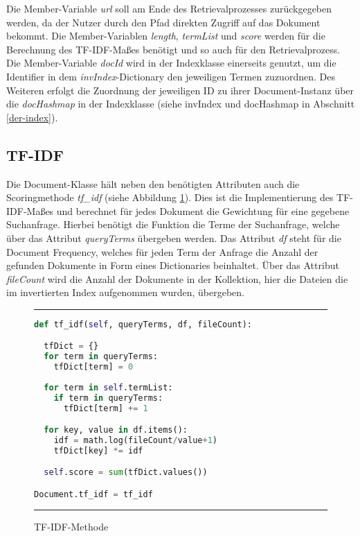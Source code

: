 Die Member-Variable \textit{url} soll am Ende des Retrievalprozesses zurückgegeben werden, da der Nutzer durch den Pfad direkten Zugriff auf das Dokument bekommt. Die Member-Variablen \textit{length}, \textit{termList} und \textit{score} werden für die Berechnung des TF-IDF-Maßes benötigt und so auch für den Retrievalprozess. Die Member-Variable \textit{docId} wird in der Indexklasse einerseits genutzt, um die Identifier in dem \textit{invIndex}-Dictionary den jeweiligen Termen zuzuordnen. Des Weiteren erfolgt die Zuordnung der jeweiligen ID zu ihrer Document-Instanz über die \textit{docHashmap} in der Indexklasse (siehe invIndex und docHashmap in Abschnitt \ref{der-index}).

\subsection{TF-IDF}\label{tf-idf}

Die Document-Klasse hält neben den benötigten Attributen auch die Scoringmethode \textit{tf\_idf} (siehe Abbildung \ref{fig:tfidf}). Dies ist die Implementierung des TF-IDF-Maßes und berechnet für jedes Dokument die Gewichtung für eine gegebene Suchanfrage. Hierbei benötigt die Funktion die Terme der Suchanfrage, welche über das Attribut \textit{queryTerms} übergeben werden. Das Attribut \textit{df} steht für die Document Frequency, welches für jeden Term der Anfrage die Anzahl der gefunden Dokumente in Form eines Dictionaries beinhaltet. Über das Attribut \textit{fileCount} wird die Anzahl der Dokumente in der Kollektion, hier die Dateien die im invertierten Index aufgenommen wurden, übergeben.

\begin{figure}
	\rule{\textwidth}{0.4pt}
		\begin{lstlisting}[language=Python]
def tf_idf(self, queryTerms, df, fileCount):

  tfDict = {}
  for term in queryTerms:
    tfDict[term] = 0  
  
  for term in self.termList:
    if term in queryTerms:
      tfDict[term] += 1

  for key, value in df.items():
    idf = math.log(fileCount/value+1)
    tfDict[key] *= idf

  self.score = sum(tfDict.values())

Document.tf_idf = tf_idf
		\end{lstlisting}
	\rule{\textwidth}{0.4pt}
	\caption{TF-IDF-Methode}
	\label{fig:tfidf}
\end{figure}

